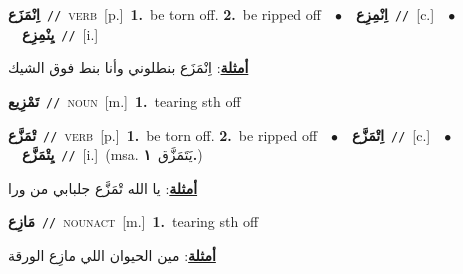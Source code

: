 \documentclass[10pt,a4paper,twoside]{article} %
\begin{document}
\begin{multicols}{2}
{\setlength\topsep{0pt}\textbf{\foreignlanguage{arabic}{اِنْمَزَع}}\ {\color{gray}\texttt{//}\color{black}}\ \textsc{verb}\ [p.]\ \textbf{1.}~be torn off.  \textbf{2.}~be ripped off\ \ $\bullet$\ \ \setlength\topsep{0pt}\textbf{\foreignlanguage{arabic}{اِنْمِزِع}}\ {\color{gray}\texttt{//}\color{black}}\ [c.]\ \ $\bullet$\ \ \setlength\topsep{0pt}\textbf{\foreignlanguage{arabic}{يِنْمِزِع}}\ {\color{gray}\texttt{//}\color{black}}\ [i.]\  \begin{flushright}\color{gray}\foreignlanguage{arabic}{\textbf{\underline{\foreignlanguage{arabic}{أمثلة}}}: اِنْمَزَع بنطلوني وأنا بنط فوق الشيك}\end{flushright}\color{black}} \vspace{2mm}

{\setlength\topsep{0pt}\textbf{\foreignlanguage{arabic}{تَمْزِيع}}\ {\color{gray}\texttt{//}\color{black}}\ \textsc{noun}\ [m.]\ \textbf{1.}~tearing sth off\ } \vspace{2mm}

{\setlength\topsep{0pt}\textbf{\foreignlanguage{arabic}{تْمَزَّع}}\ {\color{gray}\texttt{//}\color{black}}\ \textsc{verb}\ [p.]\ \textbf{1.}~be torn off.  \textbf{2.}~be ripped off\ \ $\bullet$\ \ \setlength\topsep{0pt}\textbf{\foreignlanguage{arabic}{اِتْمَزَّع}}\ {\color{gray}\texttt{//}\color{black}}\ [c.]\ \ $\bullet$\ \ \setlength\topsep{0pt}\textbf{\foreignlanguage{arabic}{يِتْمَزَّع}}\ {\color{gray}\texttt{//}\color{black}}\ [i.]\ \color{gray}(msa. \foreignlanguage{arabic}{يَتَمَزَّق}~\foreignlanguage{arabic}{\textbf{١.}})\color{black}\  \begin{flushright}\color{gray}\foreignlanguage{arabic}{\textbf{\underline{\foreignlanguage{arabic}{أمثلة}}}: يا الله تْمَزَّع جلبابي من ورا}\end{flushright}\color{black}} \vspace{2mm}

{\setlength\topsep{0pt}\textbf{\foreignlanguage{arabic}{مَازِع}}\ {\color{gray}\texttt{//}\color{black}}\ \textsc{noun\textunderscore act}\ [m.]\ \textbf{1.}~tearing sth off\  \begin{flushright}\color{gray}\foreignlanguage{arabic}{\textbf{\underline{\foreignlanguage{arabic}{أمثلة}}}: مين الحيوان اللي مازِع الورقة}\end{flushright}\color{black}} \vspace{2mm}


\end{multicols}
\end{document}
